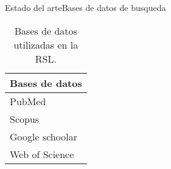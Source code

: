 \documentclass[10pt]{beamer}
\newcommand{\1}{
	\setbeamertemplate{background}{
		\texttt{[image: img/1]}
		\tikz[overlay] \fill[fill opacity=0.75,fill=white] (0,0) rectangle (-\paperwidth,\paperheight);
	}
}
\begin{document}
\begin{frame}{Estado del arte}{Bases de datos de busqueda}
	
	\begin{table}[H]
		\centering
		\begin{center}
			\caption{Bases de datos utilizadas en la RSL.}
			\label{tab:bd_RSL}
			\setlength{\tabcolsep}{0.5em} %
			{\renewcommand{\arraystretch}{1.2}%
				\begin{tabular}{p{3cm}}
					\textbf{Bases de datos} \\ \hline
					PubMed                                                                               \\
					Scopus \\				
					Google schoolar          \\
					Web of Science                                                                                               
				\end{tabular}
			}
		\end{center}
	\end{table}
	
\end{frame}
\end{document}
